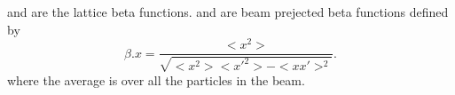 \vfill \break
{\vfill}


 and  are the lattice beta functions.  and
 are beam prejected beta functions defined by
\begin{equation}
  \beta.x = \frac{<x^{2}>}{\sqrt{<x^{2}> <x'^{2}> - <x x'>^{2}}}.
\end{equation}
where the average \vn{<>} is over all the particles in the beam.

